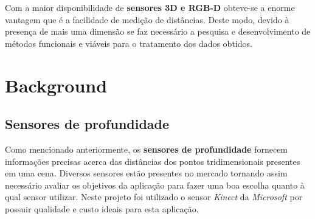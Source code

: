 \documentclass[12pt]{article}
\begin{document}
Com a maior disponibilidade de \textbf{sensores 3D e RGB-D} obteve-se a enorme vantagem que é a facilidade de medição de distâncias. Deste modo, devido à presença de mais uma dimensão se faz necessário a pesquisa e desenvolvimento de métodos funcionais e viáveis para o tratamento dos dados obtidos.

\section{Background} \label{sec:background}


\subsection{Sensores de profundidade}

Como mencionado anteriormente, os \textbf{sensores de profundidade} fornecem informações precisas acerca das distâncias dos pontos tridimensionais presentes em uma cena. Diversos sensores estão presentes no mercado tornando assim necessário avaliar os objetivos da aplicação para fazer uma boa escolha quanto à qual sensor utilizar. Neste projeto foi utilizado o sensor \textit{Kinect} da \textit{Microsoft} por possuir qualidade e custo ideais para esta aplicação.
\end{document}
